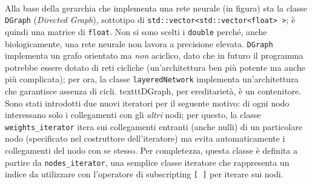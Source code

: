 \documentclass{article}
\begin{document}
\paragraph{} Alla base della gerarchia che implementa una rete neurale (in figura) sta la classe \texttt{DGraph} (\emph{Directed Graph}), sottotipo di \texttt{std::vector<std::vector<float> >}; è quindi una matrice di \texttt{float}. Non si sono scelti i \texttt{double} perché, anche biologicamente, una rete neurale non lavora a precisione elevata. \texttt{DGraph} implementa un grafo orientato ma \emph{non} aciclico, dato che in futuro il programma potrebbe essere dotato di reti cicliche (un'architettura ben più potente ma anche più complicata); per ora, la classe \texttt{layeredNetwork} implementa un'architettura che garantisce assenza di cicli. texttt{DGraph}, per ereditarietà, è un contenitore. Sono stati introdotti due nuovi iteratori per il seguente motivo: di ogni nodo interessano solo i collegamenti con gli \emph{altri} nodi; per questo, la classe \texttt{weights\_iterator} itera sui collegamenti entranti (anche nulli) di un particolare nodo (specificato nel costruttore dell'iteratore) ma evita automaticamente i collegamenti del nodo con se stesso. Per completezza, questa classe è definita a partire da \texttt{nodes\_iterator}, una semplice classe iteratore che rappresenta un indice da utilizzare con l'operatore di subscripting \texttt{[ ]} per iterare sui nodi.

\begin{center}
\end{center}
\end{document}

